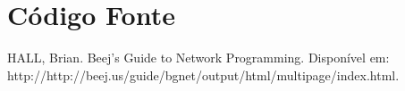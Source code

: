 \documentclass[11pt,twoside]{article}
\begin{document}
\section{Código Fonte}




\begin{thebibliography}{99}
 HALL, Brian. Beej's Guide to Network Programming. Disponível em: http://http://beej.us/guide/bgnet/output/html/multipage/index.html.
\end{thebibliography}
\end{document}
